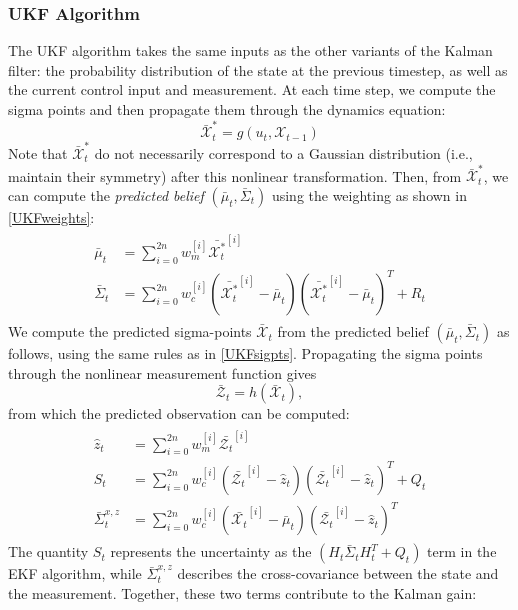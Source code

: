 \documentclass[twoside]{article}
\begin{document}
\subsubsection{UKF Algorithm}
The UKF algorithm takes the same inputs as the other variants of the Kalman filter: the probability distribution of the state at the previous timestep, as well as the current control input and measurement. At each time step, we compute the sigma points and then propagate them through the dynamics equation:
\begin{equation}
\bar{\mathcal{X}}^*_t = g(u_t, \mathcal{X}_{t-1})
\end{equation}
Note that $\bar{\mathcal{X}}^*_t$ do not necessarily correspond to a Gaussian distribution (i.e., maintain their symmetry) after this nonlinear transformation. Then, from $\bar{\mathcal{X}}^*_t$, we can compute the \textit{predicted belief} $(\bar{\mu}_t, \bar{\Sigma}_t)$ using the weighting as shown in \eqref{UKFweights}:
\begin{align}
\begin{split}
\bar{\mu}_t &= \sum_{i=0}^{2n} w_m^{[i]}\bar{\mathcal{X}_t^*}^{[i]} \\
\bar{\Sigma}_t &= \sum_{i=0}^{2n} w_c^{[i]}\left(\bar{\mathcal{X}_t^*}^{[i]} -\bar{\mu}_t\right)\left(\bar{\mathcal{X}_t^*}^{[i]} -\bar{\mu}_t\right)^T + R_t
\end{split}
\end{align}
We compute the predicted sigma-points $\bar{\mathcal{X}}_t$ from the predicted belief $(\bar{\mu}_t, \bar{\Sigma}_t)$ as follows, using the same rules as in \eqref{UKFsigpts}.
Propagating the sigma points through the nonlinear measurement function gives
\begin{equation}
\bar{\mathcal{Z}}_t = h(\bar{\mathcal{X}}_t),
\end{equation}
from which the predicted observation can be computed:
\begin{align}
\begin{split}
\hat{z}_t &=  \sum_{i=0}^{2n} w_m^{[i]}\bar{\mathcal{Z}_t}^{[i]} \\
S_t &= \sum_{i=0}^{2n} w_c^{[i]}\left(\bar{\mathcal{Z}_t}^{[i]} -\hat{z}_t\right)\left(\bar{\mathcal{Z}_t}^{[i]} -\hat{z}_t\right)^T + Q_t
\\\bar{\Sigma}_t^{x,z} &= \sum_{i=0}^{2n} w_c^{[i]}\left(\bar{\mathcal{X}_t}^{[i]} -\bar{\mu}_t\right)\left(\bar{\mathcal{Z}_t}^{[i]} -\hat{z}_t\right)^T
\end{split}
\end{align}
The quantity $S_t$ represents the uncertainty as the $(H_t \bar{\Sigma}_t H_t^T + Q_t)$ term in the EKF algorithm, while $\bar{\Sigma}_t^{x,z}$ describes the cross-covariance between the state and the measurement. Together, these two terms contribute to the Kalman gain:
\end{document}
